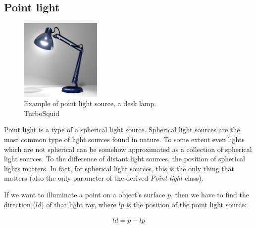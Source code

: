 \documentclass{article}
\begin{document}
\subsection*{Point light}
\begin{figure}
	\centering
	\includegraphics[width=0.35\textwidth]{point_light}
	\caption{Example of point light source, a desk lamp. \\ TurboSquid}
	\label{fig:desk_lamp}
\end{figure}

Point light is a type of a spherical light source. Spherical light sources are the most common type of light sources found in nature. To some extent even lights which are not spherical can be somehow approximated as a collection of spherical light sources. To the difference of distant light sources, the position of spherical lights matters. In fact, for spherical light sources, this is the only thing that matters (also the only parameter of the derived \textit{Point light} class). 

\vspace*{\baselineskip}

If we want to illuminate a point on a object's surface $p$, then we have to find the direction ($ld$) of that light ray, where $lp$ is the position of the point light source: 

\begin{align}
ld = p - lp
\end{align}

\vspace*{\baselineskip}
\end{document}
